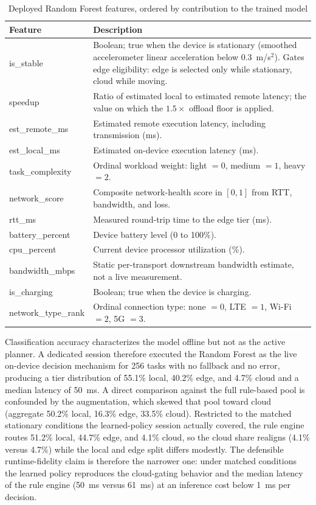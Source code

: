 \begin{table}[t]
\centering
\caption{Deployed Random Forest features, ordered by contribution to the
trained model}
\label{tab:feature-importance}
\footnotesize
\begin{tabularx}{\columnwidth}{@{}lX@{}}
\toprule
Feature & Description \\
\midrule
is\_stable & Boolean; true when the device is stationary (smoothed accelerometer linear acceleration below 0.3~m/s$^2$). Gates edge eligibility: edge is selected only while stationary, cloud while moving. \\
speedup & Ratio of estimated local to estimated remote latency; the value on which the $1.5\times$ offload floor is applied. \\
est\_remote\_ms & Estimated remote execution latency, including transmission (ms). \\
est\_local\_ms & Estimated on-device execution latency (ms). \\
task\_complexity & Ordinal workload weight: light $=0$, medium $=1$, heavy $=2$. \\
network\_score & Composite network-health score in $[0,1]$ from RTT, bandwidth, and loss. \\
rtt\_ms & Measured round-trip time to the edge tier (ms). \\
battery\_percent & Device battery level (0 to 100\%). \\
cpu\_percent & Current device processor utilization (\%). \\
bandwidth\_mbps & Static per-transport downstream bandwidth estimate, not a live measurement. \\
is\_charging & Boolean; true when the device is charging. \\
network\_type\_rank & Ordinal connection type: none $=0$, LTE $=1$, Wi-Fi $=2$, 5G $=3$. \\
\bottomrule
\end{tabularx}
\end{table}

Classification accuracy characterizes the model offline but not as the active
planner. A dedicated session therefore executed the Random Forest as the live
on-device decision mechanism for 256 tasks with no fallback and no error,
producing a tier distribution of 55.1\% local, 40.2\% edge, and 4.7\% cloud and a
median latency of 50~ms. A direct comparison against the full rule-based pool is
confounded by the augmentation, which skewed that pool toward cloud (aggregate
50.2\% local, 16.3\% edge, 33.5\% cloud). Restricted to the matched stationary
conditions the learned-policy session actually covered, the rule engine routes
51.2\% local, 44.7\% edge, and 4.1\% cloud, so the cloud share realigns (4.1\%
versus 4.7\%) while the local and edge split differs modestly. The defensible
runtime-fidelity claim is therefore the narrower one: under matched conditions the
learned policy reproduces the cloud-gating behavior and the median latency of the
rule engine (50~ms versus 61~ms) at an inference cost below 1~ms per decision.

